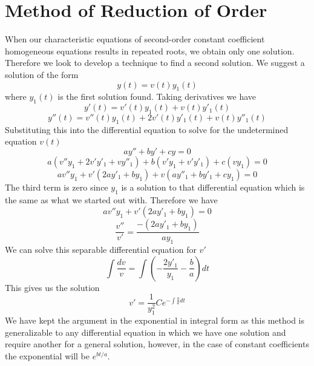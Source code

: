 \section{Method of Reduction of Order}
When our characteristic equations of second-order constant coefficient homogeneous equations results in repeated roots, we obtain only one solution. Therefore we look to develop a technique to find a second solution. We suggest a solution of the form 
\[y(t) = v(t)y_1(t)\]
where $y_1(t)$ is the first solution found. 
Taking derivatives we have
\[y'(t) = v'(t)y_1(t) + v(t)y'_1(t)\]
\[y''(t) = v''(t)y_1(t) + 2v'(t)y'_1(t) + v(t)y''_1(t)\]
Substituting this into the differential equation to solve for the undetermined equation $v(t)$
\[ay''+by'+cy = 0 \]
\[a(v''y_1 + 2v'y'_1 + vy''_1) + b(v'y_1 + v'y'_1) + c(vy_1) = 0 \]
\[av''y_1 + v'(2ay'_1+by_1) + v(ay''_1 + by'_1 + cy_1) = 0\]
The third term is zero since $y_1$ is a solution to that differential equation which is the same as what we started out with. Therefore we have
\[av''y_1 + v'(2ay'_1+by_1)=0\]
\[\frac{v''}{v'} = \frac{-(2ay'_1+by_1)}{ay_1}\]
We can solve this separable differential equation for $v'$
\[\int \frac{dv}{v} = \int (-\frac{2y'_1}{y_1} - \frac{b}{a})dt\]
This gives us the solution
\[v' =\frac{1}{y_1^2}Ce^{-\int \frac{b}{a}dt}\]
We have kept the argument in the exponential in integral form as this method is generalizable to any differential equation in which we have one solution and require another for a general solution, however, in the case of constant coefficients the exponential will be $e^{bt/a}$.


